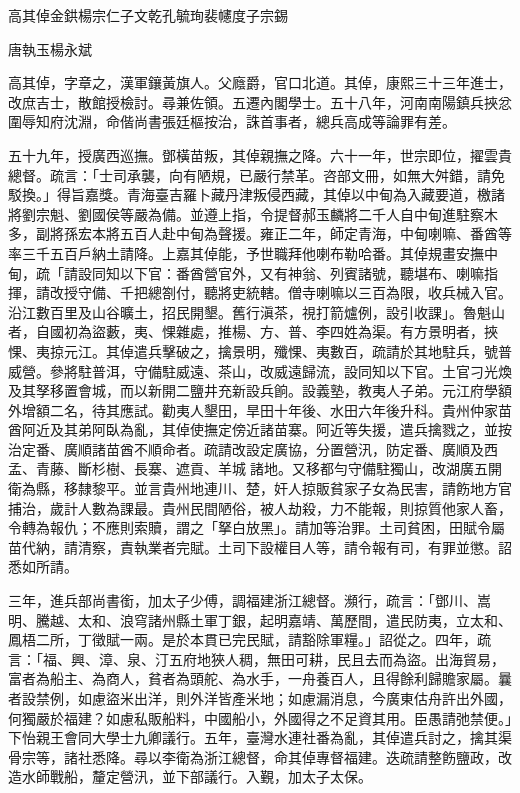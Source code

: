 
\begin{pinyinscope}
高其倬金鉷楊宗仁子文乾孔毓珣裴幰度子宗錫

唐執玉楊永斌

高其倬，字章之，漢軍鑲黃旗人。父廕爵，官口北道。其倬，康熙三十三年進士，改庶吉士，散館授檢討。尋兼佐領。五遷內閣學士。五十八年，河南南陽鎮兵挾忿圍辱知府沈淵，命偕尚書張廷樞按治，誅首事者，總兵高成等論罪有差。

五十九年，授廣西巡撫。鄧橫苗叛，其倬親撫之降。六十一年，世宗即位，擢雲貴總督。疏言：「士司承襲，向有陋規，已嚴行禁革。咨部文冊，如無大舛錯，請免駁換。」得旨嘉獎。青海臺吉羅卜藏丹津叛侵西藏，其倬以中甸為入藏要道，檄諸將劉宗魁、劉國侯等嚴為備。並遵上指，令提督郝玉麟將二千人自中甸進駐察木多，副將孫宏本將五百人赴中甸為聲援。雍正二年，師定青海，中甸喇嘛、番酋等率三千五百戶納土請降。上嘉其倬能，予世職拜他喇布勒哈番。其倬規畫安撫中甸，疏「請設同知以下官：番酋營官外，又有神翁、列賓諸號，聽堪布、喇嘛指揮，請改授守備、千把總劄付，聽將吏統轄。僧寺喇嘛以三百為限，收兵械入官。沿江數百里及山谷曠土，招民開墾。舊行滇茶，視打箭爐例，設引收課」。魯魁山者，自國初為盜藪，夷、惈雜處，推楊、方、普、李四姓為渠。有方景明者，挾惈、夷掠元江。其倬遣兵擊破之，擒景明，殲惈、夷數百，疏請於其地駐兵，號普威營。參將駐普洱，守備駐威遠、茶山，改威遠歸流，設同知以下官。土官刁光煥及其孥移置會城，而以新開二鹽井充新設兵餉。設義塾，教夷人子弟。元江府學額外增額二名，待其應試。勸夷人墾田，旱田十年後、水田六年後升科。貴州仲家苗酋阿近及其弟阿臥為亂，其倬使撫定傍近諸苗寨。阿近等失援，遣兵擒戮之，並按治定番、廣順諸苗酋不順命者。疏請改設定廣協，分置營汛，防定番、廣順及西孟、青藤、斷杉樹、長寨、遮貢、羊城諸地。又移都勻守備駐獨山，改湖廣五開衛為縣，移隸黎平。並言貴州地連川、楚，奸人掠販貧家子女為民害，請飭地方官捕治，歲計人數為課最。貴州民間陋俗，被人劫殺，力不能報，則掠質他家人畜，令轉為報仇；不應則索贖，謂之「拏白放黑」。請加等治罪。土司貧困，田賦令屬苗代納，請清察，責執業者完賦。土司下設權目人等，請令報有司，有罪並懲。詔悉如所請。

三年，進兵部尚書銜，加太子少傅，調福建浙江總督。瀕行，疏言：「鄧川、嵩明、騰越、太和、浪穹諸州縣土軍丁銀，起明嘉靖、萬歷間，遣民防夷，立太和、鳳梧二所，丁徵賦一兩。是於本貫已完民賦，請豁除軍糧。」詔從之。四年，疏言：「福、興、漳、泉、汀五府地狹人稠，無田可耕，民且去而為盜。出海貿易，富者為船主、為商人，貧者為頭舵、為水手，一舟養百人，且得餘利歸贍家屬。曩者設禁例，如慮盜米出洋，則外洋皆產米地；如慮漏消息，今廣東估舟許出外國，何獨嚴於福建？如慮私販船料，中國船小，外國得之不足資其用。臣愚請弛禁便。」下怡親王會同大學士九卿議行。五年，臺灣水連社番為亂，其倬遣兵討之，擒其渠骨宗等，諸社悉降。尋以李衛為浙江總督，命其倬專督福建。迭疏請整飭鹽政，改造水師戰船，釐定營汛，並下部議行。入覲，加太子太保。


\end{pinyinscope}
